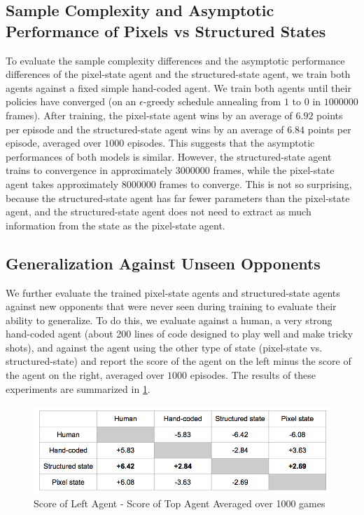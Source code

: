 \documentclass[10pt,twocolumn,letterpaper]{article}
\begin{document}
\subsection{Sample Complexity and Asymptotic Performance of Pixels vs
Structured States}
To evaluate the sample complexity differences and the asymptotic performance
differences of the pixel-state agent and the structured-state agent, we train
both agents against a fixed simple hand-coded agent. We train both agents
until their policies have converged (on an $\epsilon$-greedy schedule
annealing from $1$ to $0$ in $1000000$ frames). After training, the
pixel-state agent wins by an average of $6.92$ points per episode and the
structured-state agent wins by an average of $6.84$ points per episode,
averaged over $1000$ episodes. This suggests that the asymptotic performances
of both models is similar. However, the structured-state agent trains to
convergence in approximately $3000000$ frames, while the pixel-state agent
takes approximately $8000000$ frames to converge. This is not so surprising,
because the structured-state agent has far fewer parameters than the
pixel-state agent, and the structured-state agent does not need to extract as
much information from the state as the pixel-state agent.

\subsection{Generalization Against Unseen Opponents}
We further evaluate the trained pixel-state agents and structured-state agents
against new opponents that were never seen during training to evaluate their
ability to generalize. To do this, we evaluate against a human, a very strong
hand-coded agent (about 200 lines of code designed to play well and make
tricky shots), and against the agent using the other type of state
(pixel-state vs. structured-state) and report the score of the agent on the
left minus the score of the agent on the right, averaged over $1000$ episodes.
The results of these experiments are summarized in \ref{fig:results}.

\begin{figure}[H]
\center
\includegraphics[width=\columnwidth]{results}
\caption{
Score of Left Agent - Score of Top Agent Averaged over 1000 games
}\label{fig:results}
\end{figure}
\end{document}
